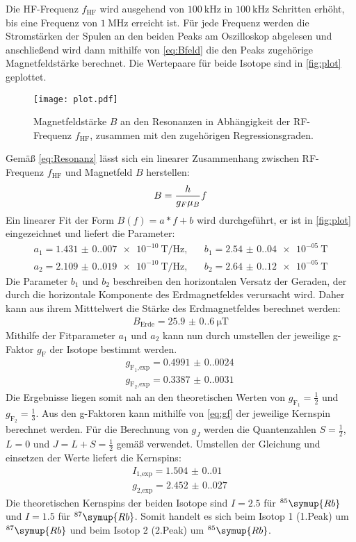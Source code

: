 Die HF-Frequenz $f_{\text{HF}}$ wird ausgehend von $\qty{100}{\kilo\hertz}$ in $\qty{100}{\kilo\hertz}$ Schritten erhöht,
bis eine Frequenz von $\qty{1}{\mega\hertz}$ erreicht ist.
Für jede Frequenz werden die Stromstärken der Spulen an den beiden Peaks am Oszilloskop abgelesen und anschließend wird
dann mithilfe von \eqref{eq:Bfeld} die den Peaks zugehörige Magnetfeldstärke berechnet.
Die Wertepaare für beide Isotope sind in \autoref{fig:plot} geplottet.

\begin{figure} [H]
  \centering
  \texttt{[image: plot.pdf]}
  \caption{Magnetfeldstärke $B$ an den Resonanzen in Abhängigkeit der RF-Frequenz $f_{\text{HF}}$, zusammen mit den zugehörigen Regressionsgraden.}
  \label{fig:plot}
\end{figure}

Gemäß \eqref{eq:Resonanz} lässt sich ein linearer Zusammenhang zwischen RF-Frequenz $f_{\text{HF}}$ und Magnetfeld $B$ herstellen:
\begin{equation}
  B = \frac{h}{g_F \mu_B}f
  \notag
\end{equation}
Ein linearer Fit der Form $B(f)=a*f+b$ wird durchgeführt, er ist in \autoref{fig:plot} eingezeichnet und liefert die Parameter:
\begin{align*}
  a_1 = \qty{1.431(0.007)e-10}{\tesla\per\hertz}, &&b_1 =\qty{2.54(0.04)e-05}{\tesla} \\
  a_2 = \qty{2.109(0.019)e-10}{\tesla\per\hertz}, &&b_2 =\qty{2.64(0.12)e-05}{\tesla}
\end{align*}
Die Parameter $b_1$ und $b_2$ beschreiben den horizontalen Versatz der Geraden, der durch die horizontale Komponente
des Erdmagnetfeldes verursacht wird. Daher kann aus ihrem Mitttelwert die Stärke des Erdmagnetfeldes berechnet werden: 
\begin{align*}
  B_{\text{Erde}} = \qty{25.9(0.6)}{\micro\tesla}
\end{align*}
Mithilfe der Fitparameter $a_1$ und $a_2$ kann nun durch umstellen der jeweilige g-Faktor $g_{\text{F}}$ der Isotope bestimmt werden.
\begin{align*}
  g_{\text{F}_1\text{,exp}} = \qty{0.4991(0.0024)}{} \\
  g_{\text{F}_2\text{,exp}} = \qty{0.3387(0.0031)}{}
\end{align*}
Die Ergebnisse liegen somit nah an den theoretischen Werten \cite{Optical_Pumping} von $g_{\text{F}_1}=\frac{1}{2}$ und $g_{\text{F}_2}=\frac{1}{3}$.
Aus den g-Faktoren kann mithilfe von \eqref{eq:gf} der jeweilige Kernspin berechnet werden. Für die Berechnung von $g_J$ 
werden die Quantenzahlen $S=\frac{1}{2}$, $L=0$ und $J=L+S=\frac{1}{2}$ gemäß \cite{Optical_Pumping} verwendet.
Umstellen der Gleichung und einsetzen der Werte liefert die Kernspins:
\begin{align*}
  I_{1\text{,exp}} = \qty{1.504(0.010)}{} \\
  g_{2\text{,exp}} = \qty{2.452(0.027)}{}
\end{align*}
Die theoretischen Kernspins der beiden Isotope \cite{Optical_Pumping} sind $I=2.5$ für $^{85}\symup{Rb}$ und $I=1.5$ für $^{87}\symup{Rb}$.
Somit handelt es sich beim Isotop 1 (1.Peak) um $^{87}\symup{Rb}$ und beim Isotop 2 (2.Peak) um $^{85}\symup{Rb}$.

